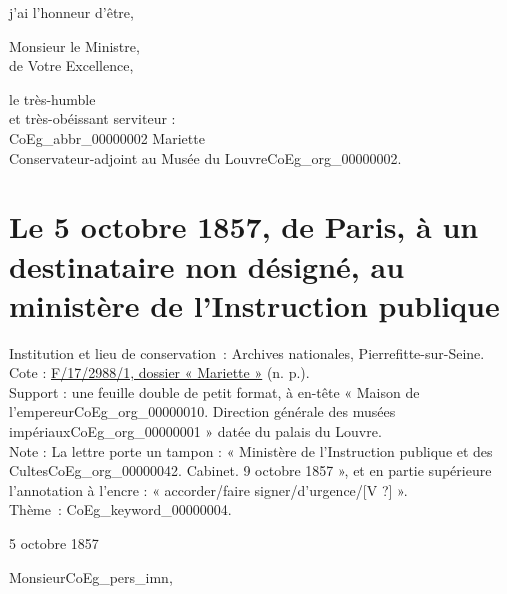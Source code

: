 \documentclass{book}
\begin{document}
{j’ai l’honneur d’être,
\begin{center}Monsieur le Ministre,\\
de Votre Excellence,\end{center}
\begin{center}\hspace{5cm}le très-humble\\
\hspace{5cm}et très-obéissant serviteur :\\
\hspace{5cm}\gls{CoEg_abbr_00000002} Mariette\\
\hspace{5cm}Conservateur-adjoint au Musée du Louvre\gls{CoEg_org_00000002}.\end{center}

\hypertarget{CoEg_Mariette_1857-10-05}{}

\section*{Le 5 octobre 1857, de Paris, à un destinataire non désigné, au ministère de l'Instruction publique}
 \label{labCoEg_Mariette_1857-10-05}
{\footnotesize
\noindent Institution et lieu de conservation~: Archives nationales, Pierrefitte-sur-Seine.\\
Cote : \hyperlink{CoEg_Mariette_ms_002}{F/17/2988/1, dossier « Mariette »} (n. p.).\\
Support : une feuille double de petit format, à en-tête « Maison de l’empereur\gls{CoEg_org_00000010}. Direction générale des musées impériaux\gls{CoEg_org_00000001} » datée du palais du Louvre.\\
Note : La lettre porte un tampon : « Ministère de l’Instruction publique et des Cultes\gls{CoEg_org_00000042}. Cabinet. 9 octobre 1857 », et en partie supérieure l’annotation à l’encre : « accorder/faire signer/d’urgence/[V ?] ».\\
Thème~: \gls{CoEg_keyword_00000004}.}

\begin{flushright}5 octobre 1857\end{flushright}

\hspace{1cm} Monsieur\gls{CoEg_pers_imn},\\

}
\end{document}
